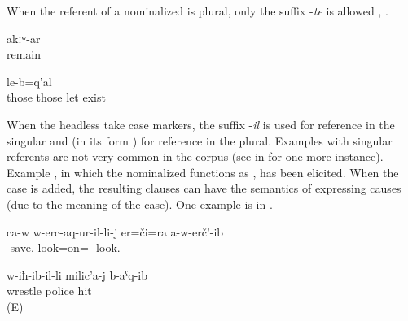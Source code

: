 When the referent of a nominalized  is plural, only the suffix -\textit{te} is allowed , . 
%
\begin{exe}
	\ex	\label{ex:Except from those who were there somewhere (i.e. hid themselves), there are no remaining ones}
	\gll	[kelg-un-te]	akːʷ-ar\\
		remain \\
	\glt	{}

	\ex	\label{ex:There are those that they put there (lit. from above let down their own people)}
		le-b=q'al\\
		those	those	let exist\\
	\glt	{}
\end{exe}

When the headless  take case markers, the suffix -\textit{il} is used for reference in the singular and  (in its  form ) for reference in the plural. Examples with singular referents are not very common in the corpus  (see  in  for one more instance). Example , in which the nominalized  functions as , has been elicited. When the  case is added, the resulting clauses can have the semantics of  expressing causes (due to the meaning of the  case). One example is  in . 
%
\begin{exe}
	\ex	\label{ex:He did not even look at his savior.}
	\gll	ca-w	w-erc-aq-ur-il-li-j	er=či=ra	a-w-erč'-ib	\\
			-save.	look=on=	-look.	\\
	\glt	{}

	\ex	\label{ex:‎The one who was wrestling hit the police officer}
	\gll	w-iħ-ib-il-li	milic'a-j	b-aˁq-ib\\
		wrestle	police	hit\\
	\glt	{} (E)
\end{exe}


